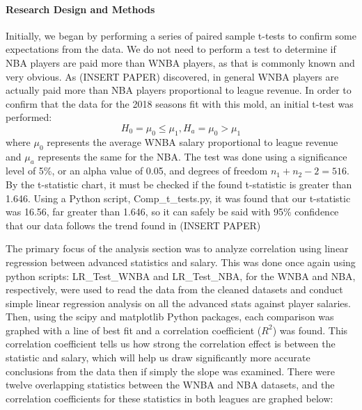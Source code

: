 \documentclass[12pt]{article}
\begin{document}
\paragraph{Research Design and Methods}
Initially, we began by performing a series of paired sample t-tests to confirm some expectations from the data. We do 
not need to perform a test to determine if NBA players are paid more than WNBA players, as that is commonly known and 
very obvious. As (INSERT PAPER) discovered, in general WNBA players are actually paid more than NBA players proportional 
to league revenue. In order to confirm that the data for the 2018 seasons fit with this mold, an initial t-test was performed:
$$H_0 = \mu_0 \leq \mu_1, H_a = \mu_0 > \mu_1$$
where $\mu_0$ represents the average WNBA salary proportional to league revenue and $\mu_a$ represents the same for 
the NBA. The test was done using a significance level of  5\%, or an alpha value of 0.05, and degrees of freedom 
$n_1 + n_2 - 2 = 516$. By the t-statistic chart, it must be checked if the found t-statistic is greater than 1.646. 
Using a Python script, Comp\_t\_tests.py, it was found that our t-statistic was 16.56, far greater than 1.646, 
so it can safely be said with 95\% confidence that our data follows the trend found in (INSERT PAPER)
\par
The primary focus of the analysis section was to analyze correlation using linear regression between advanced statistics 
and salary. This was done once again using python scripts: LR\_Test\_WNBA and LR\_Test\_NBA, for the WNBA and NBA, 
respectively, were used to read the data from the cleaned datasets and conduct simple linear regression analysis on 
all the advanced stats against player salaries. Then, using the scipy and matplotlib Python packages, each comparison 
was graphed with a line of best fit and a correlation coefficient ($R^2$) was found. This correlation coefficient 
tells us how strong the correlation effect is between the statistic and salary, which will help us draw significantly 
more accurate conclusions from the data then if simply the slope was examined. There were twelve overlapping 
statistics between the WNBA and NBA datasets, and the correlation coefficients for these statistics in both leagues
 are graphed below:
\end{document}
